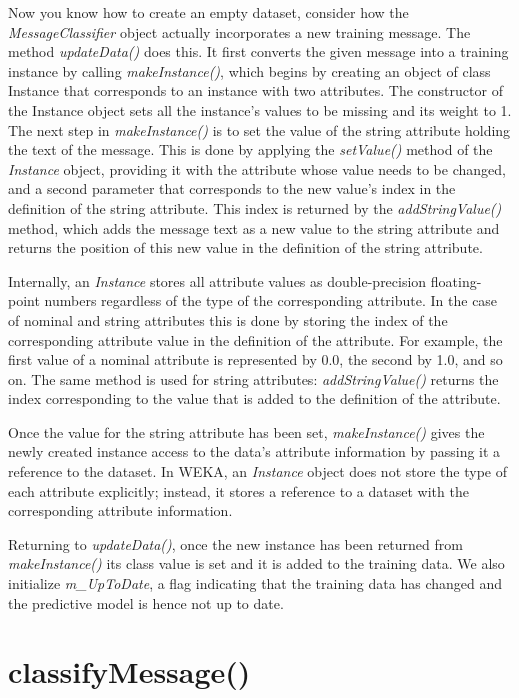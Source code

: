 Now you know how to create an empty dataset, consider how the
\textit{MessageClassifier} object actually incorporates a new training
message. The method \textit{updateData()} does this. It first
converts the given message into a training instance by calling
\textit{makeInstance()}, which begins by creating an object of class
Instance that corresponds to an instance with two attributes. The
constructor of the Instance object sets all the instance's values to
be missing and its weight to 1. The next step in
\textit{makeInstance()} is to set the value of the string attribute
holding the text of the message. This is done by applying the
\textit{setValue()} method of the \textit{Instance} object, providing
it with the attribute whose value needs to be changed, and a second
parameter that corresponds to the new value's index in the definition
of the string attribute. This index is returned by the
\textit{addStringValue()} method, which adds the message text as a new
value to the string attribute and returns the position of this new
value in the definition of the string attribute.

Internally, an \textit{Instance} stores all attribute values as
double-precision floating-point numbers regardless of the type of the
corresponding attribute. In the case of nominal and string attributes
this is done by storing the index of the corresponding attribute value
in the definition of the attribute. For example, the first value of a
nominal attribute is represented by 0.0, the second by 1.0, and so
on. The same method is used for string attributes: \textit{addStringValue()}
returns the index corresponding to the value that is added to the
definition of the attribute.

Once the value for the string attribute has been set,
\textit{makeInstance()} gives the newly created instance access to the
data's attribute information by passing it a reference to the
dataset. In WEKA, an \textit{Instance} object does not store the type
of each attribute explicitly; instead, it stores a reference to a
dataset with the corresponding attribute information.

Returning to \textit{updateData()}, once the new instance has been
returned from \textit{makeInstance()} its class value is set and it is
added to the training data. We also initialize \textit{m\_UpToDate}, a
flag indicating that the training data has changed and the predictive
model is hence not up to date.

\section{classifyMessage()}

